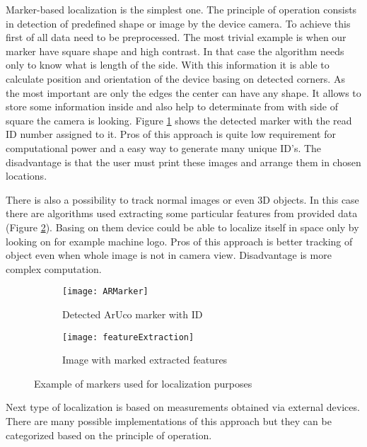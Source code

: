 \documentclass[printmode,en]{mgr}
\begin{document}
Marker-based localization is the simplest one. The principle of operation consists in detection of predefined shape or image by the device camera. To achieve this first of all data need to be preprocessed. The most trivial example is when our marker have square shape and high contrast. In that case the algorithm needs only to know what is length of the side. With this information it is able to calculate position and orientation of the device basing on detected corners. As the most important are only the edges the center can have any shape. It allows to store some information inside and also help to determinate from with side of square the camera is looking. Figure \ref{fig:ARMarker} shows the detected marker with the read ID number assigned to it. Pros of this approach is quite low requirement for computational power and a easy way to generate many unique ID's. The disadvantage is that the user must print these images and arrange them in chosen locations.

There is also a possibility to track normal images or even 3D objects. In this case there are algorithms used extracting some particular features from provided data (Figure \ref{fig:featureExtraction}). Basing on them device could be able to localize itself in space only by looking on for example machine logo. Pros of this approach is better tracking of object even when whole image is not in camera view. Disadvantage is more complex computation.

\begin{figure}[!ht]
\centering
\begin{subfigure}{.5\textwidth}
  \centering
  \texttt{[image: ARMarker]}
  \caption{Detected ArUco marker with ID \cite{ArUco}}
  \label{fig:ARMarker}
\end{subfigure}%
\begin{subfigure}{.5\textwidth}
  \centering
  \texttt{[image: featureExtraction]}
  \caption{Image with marked extracted features}
  \label{fig:featureExtraction}
\end{subfigure}
\caption{Example of markers used for localization purposes}
\label{fig:markerBasedLocalization}
\end{figure}

Next type of localization is based on measurements obtained via external devices. There are many possible implementations of this approach but they can be categorized based on the principle of operation.
\end{document}
